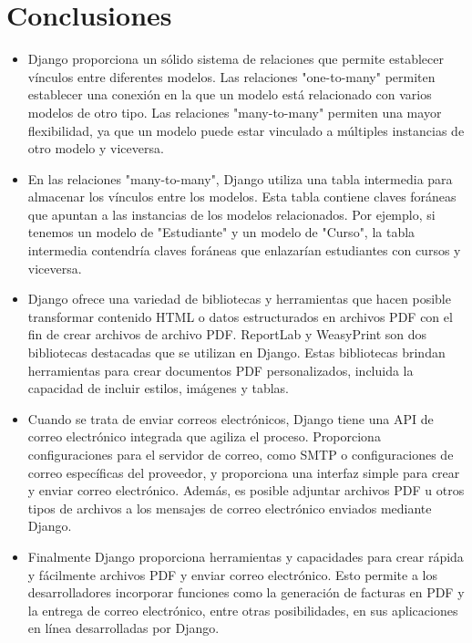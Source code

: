 \documentclass{article}
\begin{document}
 \section{Conclusiones}
	\begin{itemize}
		\item Django proporciona un sólido sistema de relaciones que permite establecer vínculos entre diferentes modelos. Las relaciones "one-to-many" permiten establecer una conexión en la que un modelo está relacionado con varios modelos de otro tipo. Las relaciones "many-to-many" permiten una mayor flexibilidad, ya que un modelo puede estar vinculado a múltiples instancias de otro modelo y viceversa.
            \item En las relaciones "many-to-many", Django utiliza una tabla intermedia para almacenar los vínculos entre los modelos. Esta tabla contiene claves foráneas que apuntan a las instancias de los modelos relacionados. Por ejemplo, si tenemos un modelo de "Estudiante" y un modelo de "Curso", la tabla intermedia contendría claves foráneas que enlazarían estudiantes con cursos y viceversa.
            \item Django ofrece una variedad de bibliotecas y herramientas que hacen posible transformar contenido HTML o datos estructurados en archivos PDF con el fin de crear archivos de archivo PDF. ReportLab y WeasyPrint son dos bibliotecas destacadas que se utilizan en Django. Estas bibliotecas brindan herramientas para crear documentos PDF personalizados, incluida la capacidad de incluir estilos, imágenes y tablas.
            \item Cuando se trata de enviar correos electrónicos, Django tiene una API de correo electrónico integrada que agiliza el proceso. Proporciona configuraciones para el servidor de correo, como SMTP o configuraciones de correo específicas del proveedor, y proporciona una interfaz simple para crear y enviar correo electrónico. Además, es posible adjuntar archivos PDF u otros tipos de archivos a los mensajes de correo electrónico enviados mediante Django.
            \item Finalmente Django proporciona herramientas y capacidades para crear rápida y fácilmente archivos PDF y enviar correo electrónico. Esto permite a los desarrolladores incorporar funciones como la generación de facturas en PDF y la entrega de correo electrónico, entre otras posibilidades, en sus aplicaciones en línea desarrolladas por Django.
	\end{itemize}	
\clearpage
\end{document}
